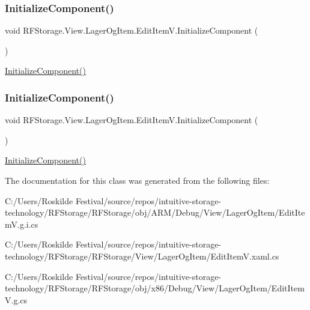 \subsubsection{\texorpdfstring{InitializeComponent()}{InitializeComponent()}\hspace{0.1cm}{\footnotesize\ttfamily [7/8]}}
{\footnotesize\ttfamily void R\+F\+Storage.\+View.\+Lager\+Og\+Item.\+Edit\+Item\+V.\+Initialize\+Component (\begin{DoxyParamCaption}{ }\end{DoxyParamCaption})}



\mbox{\hyperlink{class_r_f_storage_1_1_view_1_1_lager_og_item_1_1_edit_item_v_aa9126c5d0f8c80176b47690bc8a76eb2}{Initialize\+Component()}} 

\mbox{\label{class_r_f_storage_1_1_view_1_1_lager_og_item_1_1_edit_item_v_aa9126c5d0f8c80176b47690bc8a76eb2}} 
\subsubsection{\texorpdfstring{InitializeComponent()}{InitializeComponent()}\hspace{0.1cm}{\footnotesize\ttfamily [8/8]}}
{\footnotesize\ttfamily void R\+F\+Storage.\+View.\+Lager\+Og\+Item.\+Edit\+Item\+V.\+Initialize\+Component (\begin{DoxyParamCaption}{ }\end{DoxyParamCaption})}



\mbox{\hyperlink{class_r_f_storage_1_1_view_1_1_lager_og_item_1_1_edit_item_v_aa9126c5d0f8c80176b47690bc8a76eb2}{Initialize\+Component()}} 



The documentation for this class was generated from the following files\+:\begin{DoxyCompactItemize}
\item 
C\+:/\+Users/\+Roskilde Festival/source/repos/intuitive-\/storage-\/technology/\+R\+F\+Storage/\+R\+F\+Storage/obj/\+A\+R\+M/\+Debug/\+View/\+Lager\+Og\+Item/Edit\+Item\+V.\+g.\+i.\+cs\item 
C\+:/\+Users/\+Roskilde Festival/source/repos/intuitive-\/storage-\/technology/\+R\+F\+Storage/\+R\+F\+Storage/\+View/\+Lager\+Og\+Item/Edit\+Item\+V.\+xaml.\+cs\item 
C\+:/\+Users/\+Roskilde Festival/source/repos/intuitive-\/storage-\/technology/\+R\+F\+Storage/\+R\+F\+Storage/obj/x86/\+Debug/\+View/\+Lager\+Og\+Item/Edit\+Item\+V.\+g.\+cs\end{DoxyCompactItemize}
